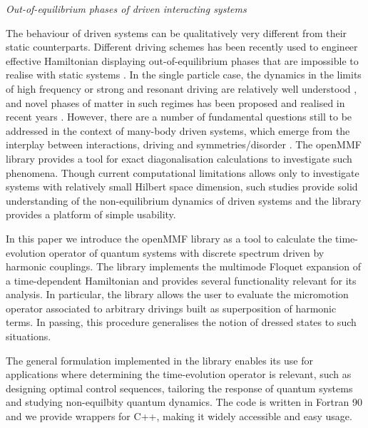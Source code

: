 \documentclass[pra,twocolumn,showkeys,preprintnumbers, amsmath,amssymb, aps,A4paper]{revtex4-1}
\begin{document}
\bigskip
\noindent
\textit{Out-of-equilibrium phases of driven interacting systems}

The behaviour of driven systems can be qualitatively very different from their static counterparts. Different driving schemes has been recently used to engineer effective Hamiltonian displaying out-of-equilibrium phases that are impossible to realise with static systems \cite{PhysRevB.82.235114}. In the single particle case, the dynamics in the limits of high frequency or strong and resonant driving are relatively well understood \cite{PhysRevB.91.245135}, and novel phases of matter in such regimes has been proposed and realised in recent years \cite{desbuquois2017controlling,nakajima2016topological}. However, there are a number of fundamental questions  still to be addressed in the context of many-body driven systems, which emerge from the interplay between interactions, driving and symmetries/disorder \cite{delande2017three, PhysRevLett.116.250401}. The openMMF library provides a tool for exact diagonalisation calculations to investigate such phenomena. Though current computational limitations allows only to investigate systems with relatively small Hilbert space dimension, such studies provide solid understanding of the non-equilibrium dynamics of driven systems \cite{PhysRevLett.119.123601,PhysRevLett.121.050602,PhysRevLett.121.076802} and the library provides a platform of simple usability.

In this paper we introduce the openMMF library as a tool to calculate the time-evolution operator of quantum systems with discrete spectrum driven by harmonic couplings. The library implements the multimode Floquet expansion of a time-dependent Hamiltonian and provides several functionality relevant for its analysis. In particular, the library allows the user to evaluate the micromotion operator associated to arbitrary drivings built as superposition of harmonic terms. In passing, this procedure generalises the notion of dressed states to such situations. 

The general formulation implemented in the library enables its use for applications where determining the time-evolution operator is relevant, such as designing optimal control sequences, tailoring the response of quantum systems and studying non-equilbity quantum dynamics. The code is written in Fortran 90 and we provide  wrappers for C++, making it widely accessible and easy usage. 




\end{document}
